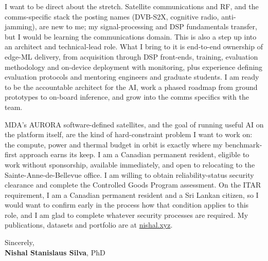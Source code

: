 \documentclass[11pt]{article}
\newcommand{\clName}{Nishal Stanislaus Silva}
\newcommand{\clSite}{https://nishal.xyz}
\begin{document}
I want to be direct about the stretch. Satellite communications and RF, and the comms-specific stack the posting names (DVB-S2X, cognitive radio, anti-jamming), are new to me; my signal-processing and DSP fundamentals transfer, but I would be learning the communications domain. This is also a step up into an architect and technical-lead role. What I bring to it is end-to-end ownership of edge-ML delivery, from acquisition through DSP front-ends, training, evaluation methodology and on-device deployment with monitoring, plus experience defining evaluation protocols and mentoring engineers and graduate students. I am ready to be the accountable architect for the AI, work a phased roadmap from ground prototypes to on-board inference, and grow into the comms specifics with the team.

MDA's AURORA software-defined satellites, and the goal of running useful AI on the platform itself, are the kind of hard-constraint problem I want to work on: the compute, power and thermal budget in orbit is exactly where my benchmark-first approach earns its keep. I am a Canadian permanent resident, eligible to work without sponsorship, available immediately, and open to relocating to the Sainte-Anne-de-Bellevue office. I am willing to obtain reliability-status security clearance and complete the Controlled Goods Program assessment. On the ITAR requirement, I am a Canadian permanent resident and a Sri Lankan citizen, so I would want to confirm early in the process how that condition applies to this role, and I am glad to complete whatever security processes are required. My publications, datasets and portfolio are at \href{\clSite}{nishal.xyz}.

\vspace{10pt}
Sincerely,\\[2pt]
\textbf{\clName}, PhD
\end{document}

